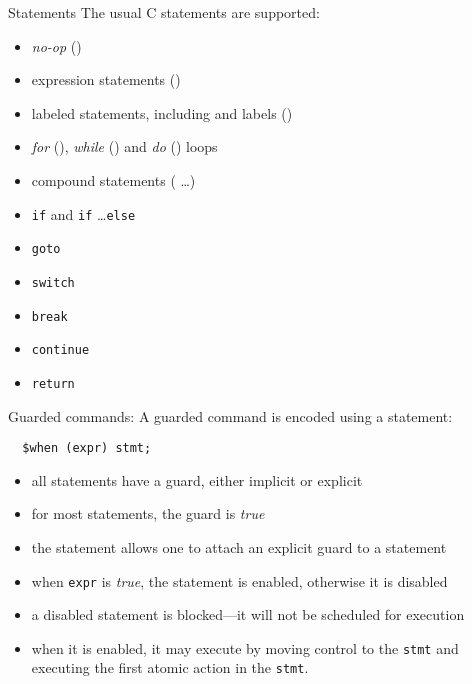 \documentclass[t]{beamer}
\begin{document}
\begin{frame}[containsverbatim]{Statements}
  The usual C statements are supported:
  \begin{itemize}
  \item \emph{no-op} (\ct{;})
  \item expression statements ()
  \item labeled statements, including  and  labels
    ()
  \item \emph{for} (), \emph{while} 
    () and \emph{do} ()
    loops
  \item compound statements (\lb {} \ldots \rb)
  \item \texttt{if} and \verb!if! \ldots \verb!else!
  \item \verb!goto!
  \item \verb!switch!
  \item \verb!break!
  \item \verb!continue!
  \item \verb!return!
  \end{itemize}
\end{frame}

\begin{frame}[containsverbatim]{Guarded commands: \cwhen}
  A guarded command is encoded using a \cwhen{} statement:
\begin{verbatim}
  $when (expr) stmt;
\end{verbatim}
  \begin{itemize}
  \item all statements have a guard, either implicit or explicit
  \item for most statements, the guard is \emph{true}
  \item the \cwhen{} statement allows one to attach an explicit guard
    to a statement
  \item when \texttt{expr} is \emph{true}, the statement is
    \alert{enabled}, otherwise it is \alert{disabled}
  \item a disabled statement is \alert{blocked}---it will not
    be scheduled for execution
  \item when it is enabled, it may execute by
    moving control to the \texttt{stmt} and executing the first atomic
    action in the \texttt{stmt}.
  \end{itemize}
\end{frame}
\end{document}
